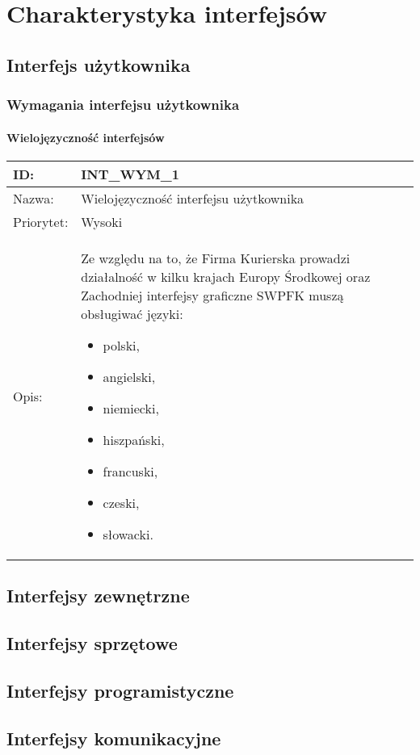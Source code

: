 \section{Charakterystyka interfejsów}

\subsection{Interfejs użytkownika}
\subsubsection{Wymagania interfejsu użytkownika}
\paragraph*{Wielojęzyczność interfejsów}
\begin{center}
\begin{tabular}[h]{|p{1.6cm}|p{13.5cm}|}
\hline
ID: & INT\_WYM\_1 \\ \hline
Nazwa: & Wielojęzyczność interfejsu użytkownika \\ \hline
Priorytet: & Wysoki \\ \hline
Opis: & Ze względu na to, że Firma Kurierska prowadzi działalność w kilku krajach Europy Środkowej oraz Zachodniej interfejsy graficzne SWPFK muszą obsługiwać języki:
\begin{itemize}
\item polski,
\item angielski,
\item niemiecki,
\item hiszpański,
\item francuski,
\item czeski,
\item słowacki.
\end{itemize} \\
\hline
\end{tabular}
\end{center}

\subsection{Interfejsy zewnętrzne}

\subsection{Interfejsy sprzętowe}

\subsection{Interfejsy programistyczne}

\subsection{Interfejsy komunikacyjne}
